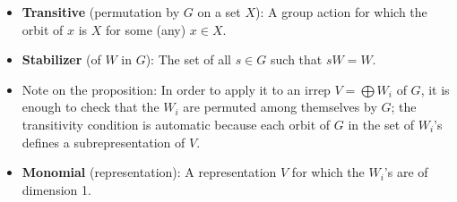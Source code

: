 \documentclass[../notes.tex]{subfiles}
\begin{document}
\begin{itemize}
    \item \textbf{Transitive} (permutation by $G$ on a set $X$): A group action for which the orbit of $x$ is $X$ for some (any) $x\in X$.
    \item \textbf{Stabilizer} (of $W$ in $G$): The set of all $s\in G$ such that $sW=W$.
    \item Note on the proposition: In order to apply it to an irrep $V=\bigoplus W_i$ of $G$, it is enough to check that the $W_i$ are permuted among themselves by $G$; the transitivity condition is automatic because each orbit of $G$ in the set of $W_i$'s defines a subrepresentation of $V$.
    \item \textbf{Monomial} (representation): A representation $V$ for which the $W_i$'s are of dimension 1.
\end{itemize}
\end{document}
